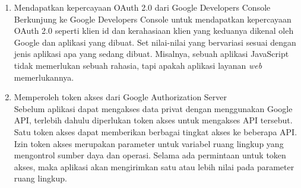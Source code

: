 \begin{enumerate}[(1)]
\item
Mendapatkan kepercayaan OAuth 2.0 dari Google Developers Console\\
Berkunjung ke Google Developers Console untuk mendapatkan kepercayaan OAuth 2.0
seperti klien id dan kerahasiaan klien yang keduanya dikenal oleh Google dan
aplikasi yang dibuat. Set nilai-nilai yang bervariasi sesuai dengan jenis
aplikasi apa yang sedang dibuat. Misalnya, sebuah aplikasi JavaScript tidak
memerlukan sebuah rahasia, tapi apakah aplikasi layanan {\it web} memerlukannya.
\item
Memperoleh token akses dari Google Authorization Server\\
Sebelum aplikasi dapat mengakses data privat dengan menggunakan Google API,
terlebih dahulu diperlukan token akses untuk mengakses API tersebut. Satu token
akses dapat memberikan berbagai tingkat akses ke beberapa API. Izin token akses
merupakan parameter untuk variabel ruang lingkup yang mengontrol sumber daya dan
operasi. Selama ada permintaan untuk token akses, maka aplikasi akan mengirimkan
satu atau lebih nilai pada parameter ruang lingkup.


\end{enumerate}
